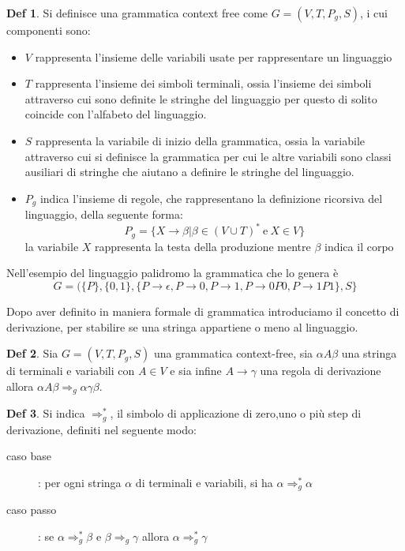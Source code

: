 \documentclass[a4paper]{report}
\theoremstyle{definition}%
\newtheorem*{defi}{Def}%
\begin{document}
\begin{defi}
  Si definisce una grammatica context free come $G = (V, T, P_g, S)$, i cui componenti sono:
  \begin{itemize}
  \item $V$ rappresenta l'insieme delle variabili usate per rappresentare un linguaggio
  \item $T$ rappresenta l'insieme dei simboli terminali, ossia l'insieme dei simboli attraverso cui sono definite le stringhe
    del linguaggio per questo di solito coincide con l'alfabeto del linguaggio.

  \item $S$ rappresenta la variabile di inizio della grammatica, ossia la variabile attraverso cui si definisce la grammatica
    per cui le altre variabili sono classi ausiliari di stringhe che aiutano a definire le stringhe del linguaggio.

  \item $P_g$ indica l'insieme di regole, che rappresentano la definizione ricorsiva del linguaggio, della seguente forma:
    \begin{equation*}
        P_g = \{ X \to \beta | \beta \in (V \cup  T)^* \ \text{e} \ X \in V\}
    \end{equation*}
    la variabile $X$ rappresenta la testa della produzione mentre $\beta$ indica il corpo
  \end{itemize}
\end{defi}

  Nell'esempio del linguaggio palidromo la grammatica che lo genera è
  \begin{equation*}
    G = (\{P\},\{0, 1\}, \{P \to \epsilon,P \to 0,P \to 1,P \to 0P0,P \to 1P1\}, S\}
  \end{equation*}

  Dopo aver definito in maniera formale di grammatica introduciamo il concetto di derivazione, per stabilire se una stringa appartiene
  o meno al linguaggio.
  
  \begin{defi}
    Sia $G = (V, T,P_g,S)$ una grammatica context-free, sia $\alpha A \beta$ una stringa di terminali e variabili con $A \in V$ e
    sia infine $A \to \gamma$ una regola di derivazione allora $\alpha A \beta \Rightarrow _g \alpha \gamma \beta$.
  \end{defi}
  \begin{defi}
    Si indica $\Rightarrow _g ^*$, il simbolo di applicazione di zero,uno o più step di derivazione, definiti nel seguente modo:
    \begin{description}
    \item [caso base]: per ogni stringa $\alpha$ di terminali e variabili, si ha $\alpha \Rightarrow _g ^* \alpha$
    \item [caso passo]: se $\alpha \Rightarrow _g ^* \beta$ e $\beta \Rightarrow _ g \gamma$ allora $\alpha \Rightarrow _g ^* \gamma$
    \end{description}
  \end{defi}
\end{document}
